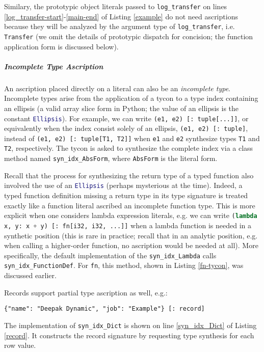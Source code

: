 \documentclass{sigplanconf}
\newcommand{\lip}[1]{\lstinline[language=Python,basicstyle=\ttfamily\small,deletendkeywords={tuple,buffer,map}]{#1}}
\begin{document}
Similary, the prototypic object literals passed to \lip{log_transfer} on lines \ref{log_transfer-start}-\ref{main-end} of Listing \ref{example} do not need ascriptions because they will be analyzed by the  argument type of \lip{log_transfer}, i.e. \lip{Transfer} (we omit the details of prototypic dispatch for concision; the function application form is discussed below).

\subparagraph{Incomplete Type Ascription} An ascription placed directly on a literal can also be an \emph{incomplete type}. Incomplete types arise from the application of a tycon to a type index containing an ellipsis (a valid array slice form in Python; the value of an ellipsis is the constant \lip{Ellipsis}). For example, we can write \lstinline[basicstyle=\ttfamily\small]{(e1, e2) [: tuple[...]]}, or equivalently when the index consist solely of an ellipsis, \lstinline[basicstyle=\ttfamily\small]{(e1, e2) [: tuple]}, instead of \lstinline[basicstyle=\ttfamily\small]{(e1, e2) [: tuple[T1, T2]]} when \lstinline[basicstyle=\ttfamily\small]{e1} and \lstinline[basicstyle=\ttfamily\small]{e2} synthesize types \lstinline[basicstyle=\ttfamily\small]{T1} and \lip{T2}, respectively. The tycon is asked to synthesize the complete index via a class method named \lip{syn_idx_AbsForm}, where \lip{AbsForm} is the literal form. 

Recall that the process for synthesizing the return type of a typed function also involved the use of an \lip{Ellipsis} (perhaps mysterious at the time). Indeed, a typed function definition missing a return type in its type signature is treated exactly like a   function literal ascribed an incomplete function type. This is more explicit when one considers lambda expression literals, e.g. we can write \lip{(lambda x, y: x + y) [: fn[i32, i32, ...]]} when a lambda function is needed in a synthetic position (this is rare in practice; recall that in an analytic position, e.g. when calling a higher-order function, no ascription would be needed at all). 
More specifically, the default implementation of the \lip{syn_idx_Lambda} calls \lip{syn_idx_FunctionDef}. For \lip{fn}, this method, shown in Listing \ref{fn-tycon}, was discussed earlier.


Records support partial type ascription as well, e.g.: 
\vspace{3px}
\begin{lstlisting}[numbers=none,basicstyle=\ttfamily\scriptsize]
{"name": "Deepak Dynamic", "job": "Example"} [: record]
\end{lstlisting}
The implementation of \lip{syn_idx_Dict} is shown on line \ref{syn_idx_Dict} of Listing \ref{record}. It constructs the record signature by requesting type synthesis for each row value.
\end{document}
